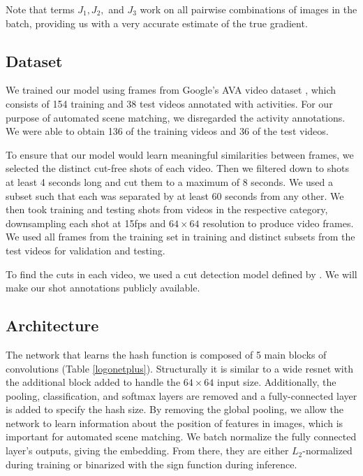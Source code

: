 \documentclass{article}
\begin{document}
\begin{multicols}{2}
Note that terms $J_1, J_2,$ and $J_3$ work on all pairwise combinations of images in the batch, providing us with a very accurate estimate of the true gradient.


\subsection{Dataset}

We trained our model using frames from Google's AVA video dataset \cite{ava17}, which consists of 154 training and 38 test videos annotated with activities.
For our purpose of automated scene matching, we disregarded the activity annotations.
We were able to obtain 136 of the training videos and 36 of the test videos.

To ensure that our model would learn meaningful similarities between frames, we selected the distinct cut-free shots of each video.
Then we filtered down to shots at least 4 seconds long and cut them to a maximum of 8 seconds.
We used a subset such that each was separated by at least 60 seconds from any other.
We then took training and testing shots from videos in the respective category, downsampling each shot at 15fps and $64\times64$ resolution to produce video frames.
We used all frames from the training set in training and distinct subsets from the test videos for validation and testing.

To find the cuts in each video, we used a cut detection model defined by \cite{Gygli17}.
We will make our shot annotations publicly available.


\subsection{Architecture}

The network that learns the hash function is composed of 5 main blocks of convolutions (Table \ref{logonetplus}). 
Structurally it is similar to a wide resnet \cite{wideResnet} with the additional block added to handle the $64\times64$ input size.
Additionally, the pooling, classification, and softmax layers are removed and a fully-connected layer is added to specify the hash size.
By removing the global pooling, we allow the network to learn information about the position of features in images, which is important for automated scene matching.
We batch normalize the fully connected layer's outputs, giving the embedding.
From there, they are either $L_2$-normalized during training or binarized with the sign function during inference.


\end{multicols}
\end{document}
